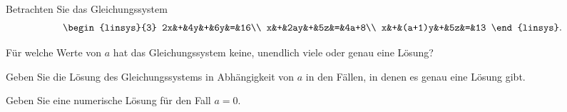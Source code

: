 Betrachten Sie das Gleichungssystem
\[
\begin{linsys}{3}
2x&+&4y&+&6y&=&16\\
x&+&2ay&+&5z&=&4a+8\\
x&+&(a+1)y&+&5z&=&13
\end{linsys}.
\]
\begin{teilaufgaben}
\item
Für welche Werte von $a$ hat das Gleichungssystem
keine, unendlich viele oder genau eine Lösung?
\item
Geben Sie die Lösung des Gleichungssystems in Abhängigkeit von $a$
in den Fällen, in denen es genau eine Lösung gibt.
\item
Geben Sie eine numerische Lösung für den Fall $a=0$.
\end{teilaufgaben}


